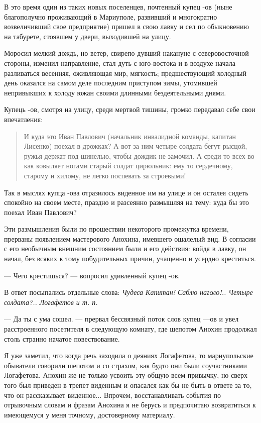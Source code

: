 \documentclass[a4paper,20pt]{report}
\begin{document}
В это время один из таких новых поселенцев,
почтенный купец -ов (ныне благополучно проживающий
в Мариуполе, развивший и многократно возвеличивший свое
предприятие) пришел в свою лавку и сел по обыкновению
на табурете, стоявшем у двери, выходившей на улицу. 

Моросил мелкий дождь, но ветер, свирепо дувший накануне с северовосточной
стороны, изменил направление, стал дуть с юго-востока и в воздухе начала
разливаться весенняя, оживляющая мир, мягкость; предшествующий холодный день
оказался на самом деле последним приступом зимы, утомившей непривыкших к холоду
южан своими длинными бездеятельными днями.

Купець -ов, смотря на улицу, среди мертвой тишины, 
громко передавал себе свои впечатления: 

\begin{quote}
\em\bfseries

И куда это
Иван Павлович (начальник инвалидной команды, капитан Лисенко) поехал в дрожках?
А вот за ним четыре солдата бегут рысцой, ружья держат под шинелью, чтобы дождик не замочил. А среди-то всех во как
ковыляет ногами старый солдат цирюльник: ему то сердечному, старому и хилому, не легко поспевать за строевыми!
\end{quote}

Так в мыслях купца -ова отразилось виденное
им на улице и он осталея сидеть спокойно на своем
месте, праздно и разсеянно размышляя на тему: куда бы это
поехал Иван Павлович?

Эти размышления были по прошествии некоторого промежутка времени, прерваны появлением мастерового 
Анохина, имевшего ошалелый вид. В согласии с его необычным внешним состоянием были и его действия: войдя в лавку, 
он начал, без всяких к тому побудительных причин, учащенно и усердно креститься.

— Чего крестишься? — вопросил удивленный купец -ов.

В ответ посыпались отдельные слова: \emph{Чудеса Капитан! Саблю наголо!..
Четыре солдата?.. Логафетов и т. п.}

— Да ты с ума сошел. — прервал бессвязный поток слов купец —ов и увел расстроенного 
посетителя в следующую комнату, где шепотом Анохин продолжал столь странно начатое  
повествование.

Я уже заметил, что когда речь заходила о деяниях Логафетова, то мариупольские
обыватели говорили шепотом и со страхом, как будто они были
соучастниками Логафетова. Анохин же не только усвоить эту общую всем
привычку, но сверх того был приведен в трепет виденным и опасался как
бы не быть в ответе за то, что он рассказывает виденное... Впрочем,
восстанавливать события по отрывочным словам и фразам Анохина я не берусь
и предпочитаю возвратиться к имеющемуся у меня точному, достоверному
материалу.
\end{document}
